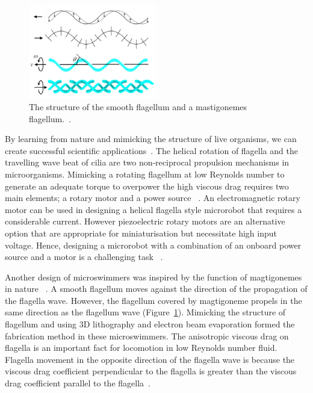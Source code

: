 \documentclass[a4paper,11pt]{article}
\begin{document}
\begin{sloppypar}
\paragraph{}

\begin{figure}
  \begin{center}
    \includegraphics[width=0.5\textwidth]{10}
  \caption{ The structure of the smooth flagellum and a mastigonemes flagellum.~\citep{gao2013bioinspired}.}
  \label{10}
\end{center}
\end{figure}

By learning from nature and mimicking the structure of live organisms, we can create successful  
scientific applications~\citep{qiunanohelices}. 
The helical rotation of flagella and the travelling wave beat of cilia are two non-reciprocal propulsion
 mechanisms in microorganisms. Mimicking a rotating flagellum at low Reynolds number to generate an 
adequate torque to overpower the high viscous drag requires two main elements; a rotary motor and a
 power source ~\citep{qiunanohelices}. 
An electromagnetic rotary motor can be used in designing a helical flagella style microrobot that 
requires a considerable current. However piezoelectric rotary motors are an alternative option 
that are appropriate for miniaturisation but necessitate high input voltage.  Hence, designing a microrobot with a 
combination of an onboard power source and a motor is a challenging task ~\citep{qiunanohelices}.


Another design of microswimmers was inspired by the function of magtigonemes in nature ~\citep{tottori2013artificial}.
 A smooth flagellum moves against the direction of the propagation of the flagella wave. However, 
the flagellum covered by magtigoneme propels in the same direction as the flagellum wave (Figure~\ref{10}). Mimicking 
the structure of flagellum and using 3D lithography and electron beam evaporation formed the fabrication 
method in these microswimmers.
The anisotropic viscous drag on flagella is an important fact for locomotion in low Reynolds number fluid. 
Flagella movement in the opposite direction of the flagella wave is because the 
viscous drag coefficient perpendicular to the flagella is greater than the viscous drag coefficient parallel to 
the flagella~\citep{tottori2013artificial}. 


\end{sloppypar}
\end{document}
